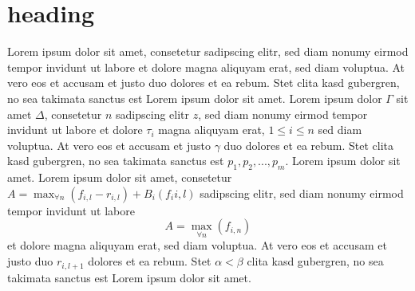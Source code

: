 \section{heading}\label{mylabel}
Lorem ipsum dolor sit amet, consetetur sadipscing elitr, sed diam nonumy eirmod
tempor invidunt ut labore et dolore magna aliquyam erat, sed diam voluptua. At
vero eos et accusam et justo duo dolores et ea rebum. Stet clita kasd
gubergren, no sea takimata sanctus est Lorem ipsum dolor sit amet. Lorem ipsum
dolor $\Gamma$ sit amet $\Delta$, consetetur $n$ sadipscing elitr $z$, sed diam
nonumy eirmod tempor invidunt ut labore et dolore $\tau_i$ magna aliquyam erat,
$1 \leq i \leq n$ sed diam voluptua. At vero eos et accusam et justo $\gamma$
duo dolores et ea rebum. Stet clita kasd gubergren, no sea takimata sanctus est
$p_1,p_2,...,p_m$. Lorem ipsum dolor sit amet. Lorem ipsum dolor sit amet,
consetetur $A=\max_{\forall n}(f_{i,l}-r_{i,l}) + B_i(f_i{i,l})$ sadipscing
elitr, sed diam nonumy eirmod tempor invidunt ut labore
\[A=\max_{\forall n}(f_{i,n})\]
et dolore magna aliquyam erat, sed diam voluptua. At vero eos et accusam et
justo duo $r_{i,l+1}$ dolores et ea rebum. Stet $\alpha < \beta$ clita kasd
gubergren, no sea takimata sanctus est Lorem ipsum dolor sit amet.
